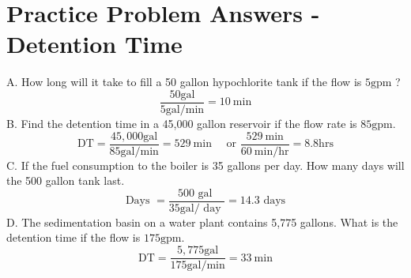 \documentclass[10pt]{article}
\begin{document}
\section{Practice Problem Answers - Detention Time}
A. How long will it take to fill a 50 gallon hypochlorite tank if the flow is $5 \mathrm{gpm}$ ?
$$
\frac{50 \mathrm{gal}}{5 \mathrm{gal} / \mathrm{min}}=10 \mathrm{~min}
$$
B. Find the detention time in a 45,000 gallon reservoir if the flow rate is $85 \mathrm{gpm}$.
$$
\mathrm{DT}=\frac{45,000 \mathrm{gal}}{85 \mathrm{gal} / \mathrm{min}}=529 \mathrm{~min} \quad \text { or } \frac{529 \mathrm{~min}}{60 \mathrm{~min} / \mathrm{hr}}=8.8 \mathrm{hrs}
$$
C. If the fuel consumption to the boiler is 35 gallons per day. How many days will the 500 gallon tank last.
$$
\text { Days }=\frac{500 \text { gal }}{35 \mathrm{gal} / \text { day }}=14.3 \text { days }
$$
D. The sedimentation basin on a water plant contains 5,775 gallons. What is the detention time if the flow is $175 \mathrm{gpm}$.
$$
\mathrm{DT}=\frac{5,775 \mathrm{gal}}{175 \mathrm{gal} / \mathrm{min}}=33 \mathrm{~min}
$$
\end{document}
